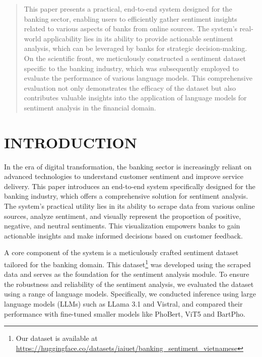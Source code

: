 {\cn

\begin{abstract}
This paper presents a practical, end-to-end system designed for the banking sector, enabling users to efficiently gather sentiment insights related to various aspects of banks from online sources. The system's real-world applicability lies in its ability to provide actionable sentiment analysis, which can be leveraged by banks for strategic decision-making. On the scientific front, we meticulously constructed a sentiment dataset specific to the banking industry, which was subsequently employed to evaluate the performance of various language models. This comprehensive evaluation not only demonstrates the efficacy of the dataset but also contributes valuable insights into the application of language models for sentiment analysis in the financial domain. 
\end{abstract}


\section{INTRODUCTION}

In the era of digital transformation, the banking sector is increasingly reliant on advanced technologies to understand customer sentiment and improve service delivery. This paper introduces an end-to-end system specifically designed for the banking industry, which offers a comprehensive solution for sentiment analysis. The system's practical utility lies in its ability to scrape data from various online sources, analyze sentiment, and visually represent the proportion of positive, negative, and neutral sentiments. This visualization empowers banks to gain actionable insights and make informed decisions based on customer feedback.

A core component of the system is a meticulously crafted sentiment dataset tailored for the banking domain. This dataset\footnote{Our dataset is available at \url{https://huggingface.co/datasets/iaiuet/banking_sentiment_vietnamese}} was developed using the scraped data and serves as the foundation for the sentiment analysis module. To ensure the robustness and reliability of the sentiment analysis, we evaluated the dataset using a range of language models. Specifically, we conducted inference using large language models (LLMs) such as LLama 3.1\cite{dubey2024llama3herdmodels} and Vistral\cite{chien2023vistral}, and compared their performance with fine-tuned smaller models like PhoBert\cite{phobert}, ViT5\cite{phan-etal-2022-vit5} and BartPho\cite{bartpho}.

}
